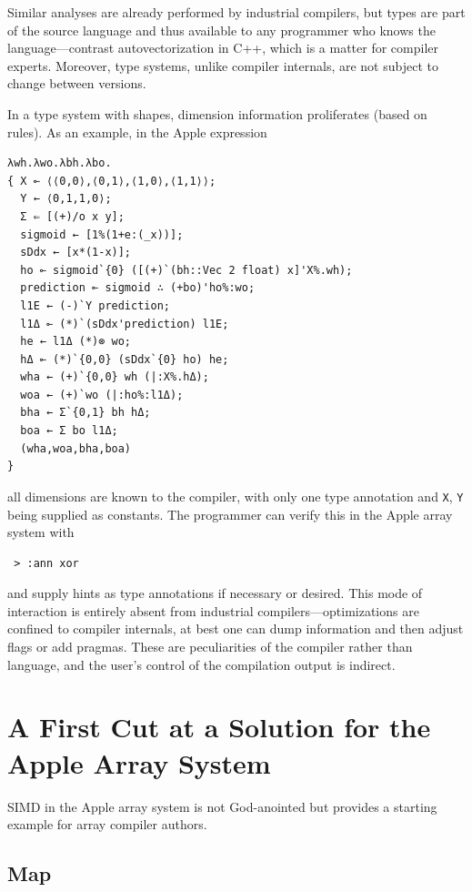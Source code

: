 \documentclass{article}
\begin{document}
Similar analyses are already performed by industrial compilers, but types are part of the source language and thus available to any programmer who knows the language---contrast autovectorization in C++, which is a matter for compiler experts. Moreover, type systems, unlike compiler internals, are not subject to change between versions.

In a type system with shapes, dimension information proliferates (based on rules).
As an example, in the Apple expression

\begin{verbatim}
λwh.λwo.λbh.λbo.
{ X ⟜ ⟨⟨0,0⟩,⟨0,1⟩,⟨1,0⟩,⟨1,1⟩⟩;
  Y ← ⟨0,1,1,0⟩;
  Σ ⇐ [(+)/o x y];
  sigmoid ← [1%(1+e:(_x))];
  sDdx ← [x*(1-x)];
  ho ⟜ sigmoid`{0} ([(+)`(bh::Vec 2 float) x]'X%.wh);
  prediction ⟜ sigmoid ∴ (+bo)'ho%:wo;
  l1E ← (-)`Y prediction;
  l1Δ ⟜ (*)`(sDdx'prediction) l1E;
  he ← l1Δ (*)⊗ wo;
  hΔ ⟜ (*)`{0,0} (sDdx`{0} ho) he;
  wha ← (+)`{0,0} wh (|:X%.hΔ);
  woa ← (+)`wo (|:ho%:l1Δ);
  bha ← Σ`{0,1} bh hΔ;
  boa ← Σ bo l1Δ;
  (wha,woa,bha,boa)
}
\end{verbatim}

all dimensions are known to the compiler, with only one type annotation and \verb|X|, \verb|Y| being supplied as constants.
The programmer can verify this in the Apple array system with

\begin{verbatim}
 > :ann xor
\end{verbatim}

and supply hints as type annotations if necessary or desired. This mode of interaction is entirely absent from industrial compilers—optimizations are confined to compiler internals, at best one can dump information and then adjust flags or add pragmas. These are peculiarities of the compiler rather than language, and the user's control of the compilation output is indirect.


\section{A First Cut at a Solution for the Apple Array System}

SIMD in the Apple array system is not God-anointed but provides a starting example for array compiler authors.

\subsection{Map}
\end{document}

